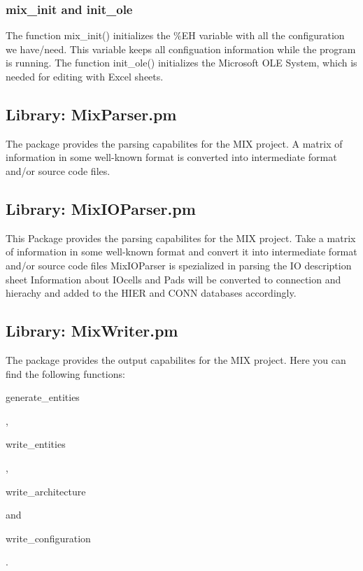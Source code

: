 \documentclass[a4paper,12pt]{article}
\begin{document}
{\subsubsection{mix\_init and init\_ole}
The function mix\_init() initializes the \%EH variable with all the configuration we have/need. This variable keeps all configuation information while the program is running.\newline
The function init\_ole() initializes the Microsoft OLE System, which is needed for editing with Excel sheets.
\subsubsection{}


\subsection{Library: MixParser.pm}
The package provides the parsing capabilites for the MIX project. A matrix of information in some well-known format is converted into intermediate format and/or source code files.


\subsection{Library: MixIOParser.pm}
This Package provides the parsing capabilites for the MIX project. Take a matrix of information in some well-known format and convert it into intermediate format and/or source code files MixIOParser is spezialized in parsing the IO description sheet Information about IOcells and Pads will be converted to connection and hierachy and added to the HIER and CONN databases accordingly.


\subsection{Library: MixWriter.pm}
The package provides the output capabilites for the MIX project. Here you can find the following functions: \begin{it}generate\_entities\end{it}, \begin{it}write\_entities\end{it}, \begin{it}write\_architecture\end{it} and \begin{it}write\_configuration\end{it}.\newline


}
\end{document}
